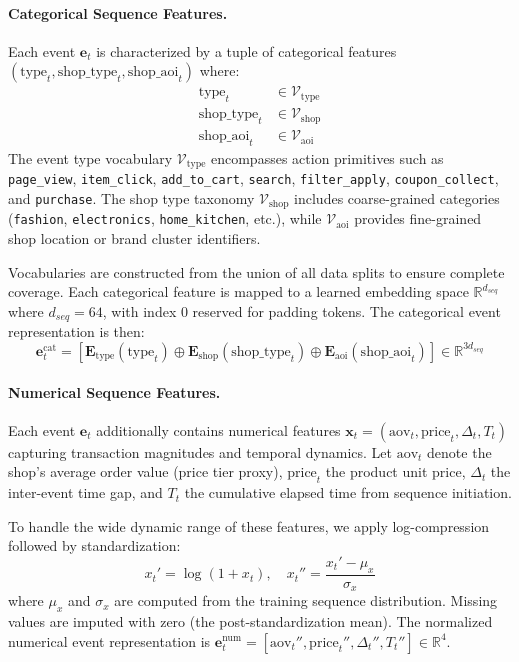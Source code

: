 \paragraph{Categorical Sequence Features.}
Each event $\mathbf{e}_t$ is characterized by a tuple of categorical features $(\text{type}_t, \text{shop\_type}_t, \text{shop\_aoi}_t)$ where:
\begin{align}
\text{type}_t &\in \mathcal{V}_{\text{type}} \\
\text{shop\_type}_t &\in \mathcal{V}_{\text{shop}} \\
\text{shop\_aoi}_t &\in \mathcal{V}_{\text{aoi}}
\end{align}
The event type vocabulary $\mathcal{V}_{\text{type}}$ encompasses action primitives such as \texttt{page\_view}, \texttt{item\_click}, \texttt{add\_to\_cart}, \texttt{search}, \texttt{filter\_apply}, \texttt{coupon\_collect}, and \texttt{purchase}. The shop type taxonomy $\mathcal{V}_{\text{shop}}$ includes coarse-grained categories (\texttt{fashion}, \texttt{electronics}, \texttt{home\_kitchen}, etc.), while $\mathcal{V}_{\text{aoi}}$ provides fine-grained shop location or brand cluster identifiers.

Vocabularies are constructed from the union of all data splits to ensure complete coverage. Each categorical feature is mapped to a learned embedding space $\mathbb{R}^{d_{seq}}$ where $d_{seq} = 64$, with index 0 reserved for padding tokens. The categorical event representation is then:
\begin{equation}
\mathbf{e}_t^{\text{cat}} = [\mathbf{E}_{\text{type}}(\text{type}_t) \oplus \mathbf{E}_{\text{shop}}(\text{shop\_type}_t) \oplus \mathbf{E}_{\text{aoi}}(\text{shop\_aoi}_t)] \in \mathbb{R}^{3d_{seq}}
\end{equation}

\paragraph{Numerical Sequence Features.}
Each event $\mathbf{e}_t$ additionally contains numerical features $\mathbf{x}_t = (\text{aov}_t, \text{price}_t, \Delta_t, T_t)$ capturing transaction magnitudes and temporal dynamics. Let $\text{aov}_t$ denote the shop's average order value (price tier proxy), $\text{price}_t$ the product unit price, $\Delta_t$ the inter-event time gap, and $T_t$ the cumulative elapsed time from sequence initiation.

To handle the wide dynamic range of these features, we apply log-compression followed by standardization:
\begin{equation}
x_t' = \log(1 + x_t), \quad x_t'' = \frac{x_t' - \mu_x}{\sigma_x}
\end{equation}
where $\mu_x$ and $\sigma_x$ are computed from the training sequence distribution. Missing values are imputed with zero (the post-standardization mean). The normalized numerical event representation is $\mathbf{e}_t^{\text{num}} = [\text{aov}_t'', \text{price}_t'', \Delta_t'', T_t''] \in \mathbb{R}^4$.


